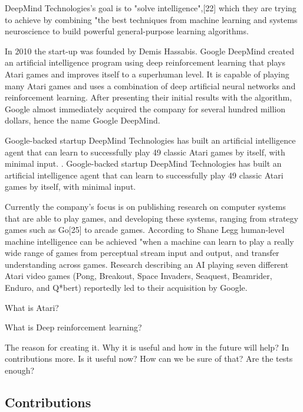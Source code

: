 \documentclass{article}
\begin{document}
DeepMind Technologies's goal is to "solve intelligence",[22] which they are trying to achieve by combining "the best techniques from machine learning and systems neuroscience to build powerful general-purpose learning algorithms.

In 2010 the start-up was founded by Demis Hassabis.
Google DeepMind created an artificial intelligence program using deep reinforcement learning that plays Atari games and improves itself to a superhuman level. It is capable of playing many Atari games and uses a combination of deep artificial neural networks and reinforcement learning. After presenting their initial results with the algorithm, Google almost immediately acquired the company for several hundred million dollars, hence the name Google DeepMind. 

Google-backed startup DeepMind Technologies has built an artificial intelligence agent that can learn to successfully play 49 classic Atari games by itself, with minimal input. \cite{liatClark}. Google-backed startup DeepMind Technologies has built an artificial intelligence agent that can learn to successfully play 49 classic Atari games by itself, with minimal input.

Currently the company's focus is on publishing research on computer systems that are able to play games, and developing these systems, ranging from strategy games such as Go[25] to arcade games. According to Shane Legg human-level machine intelligence can be achieved "when a machine can learn to play a really wide range of games from perceptual stream input and output, and transfer understanding across games. Research describing an AI playing seven different Atari video games (Pong, Breakout, Space Invaders, Seaquest, Beamrider, Enduro, and Q*bert) reportedly led to their acquisition by Google.


What is Atari?

What is Deep reinforcement learning?

The reason for creating it. Why it is useful and how in the future will help? In contributions more.
Is it useful now? How can we be sure of that? Are the tests enough?

\cite{liamThung}

\vspace{12pt}
 
\subsection*{{ {\textbf{Contributions}}}}
\end{document}
